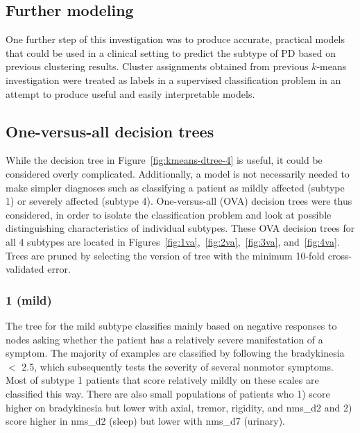 \documentclass[10pt]{article}
\begin{document}
\begin{multicols}{2}
\section{Further modeling}

One further step of this investigation was to produce accurate, practical
models that could be used in a clinical setting to predict the subtype of PD
based on previous clustering results. Cluster assignments obtained from
previous $k$-means investigation were treated as labels in a supervised
classification problem in an attempt to produce useful and easily interpretable
models.

\subsection{One-versus-all decision trees}
\label{sub:ova}

While the decision tree in Figure~\ref{fig:kmeans-dtree-4} is useful, it could
be considered overly complicated. Additionally, a model is not necessarily
needed to make simpler diagnoses such as classifying a patient as mildly
affected (subtype 1) or severely affected (subtype 4). One-versus-all (OVA)
decision trees were thus considered, in order to isolate the classification
problem and look at possible distinguishing characteristics of individual
subtypes. These OVA decision trees for all 4 subtypes are located in
Figures~\ref{fig:1va},~\ref{fig:2va},~\ref{fig:3va}, and~\ref{fig:4va}. Trees
are pruned by selecting the version of tree with the minimum 10-fold
cross-validated error.

\subsubsection{1 (mild)}
The tree for the mild subtype classifies mainly based on negative responses to
nodes asking whether the patient has a relatively severe manifestation of a
symptom. The majority of examples are classified by following the bradykinesia
$<$ 2.5, which subsequently tests the severity of several nonmotor symptoms.
Most of subtype 1 patients that score relatively mildly on these scales are
classified this way. There are also small populations of patients who 1) score
higher on bradykinesia but lower with axial, tremor, rigidity, and nms\_d2 and
2) score higher in nms\_d2 (sleep) but lower with nms\_d7 (urinary).


\end{multicols}
\end{document}
